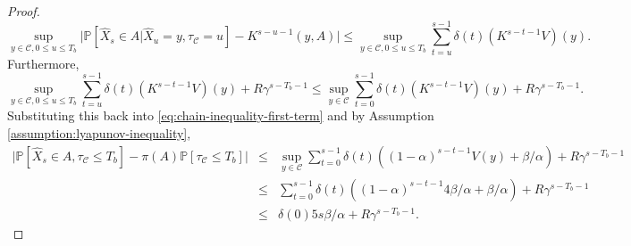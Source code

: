 \begin{proof}
\begin{equation*}
  \sup_{y \in \mathcal{C}, 0 \leq u \leq T_b}{\vert 
\mathbb{P}[\hat{X}_s\in A \vert \hat{X}_u = y, \tau_{\mathcal{C}}=u] - K^{s-u-1}(y, A) \vert} \leq \sup_{y \in \mathcal{C}, 0 \leq u \leq T_b}{\sum_{t=u}^{s-1} \delta(t) (K^{s-t-1} V)(y)}.
\end{equation*}
%
Furthermore,
\begin{equation*}
    \sup_{y \in \mathcal{C}, 0 \leq u \leq T_b}{\sum_{t=u}^{s-1} \delta(t) (K^{s-t-1} V)(y)} +  R \gamma^{s-T_b-1}  \leq \sup_{y \in \mathcal{C}}{\sum_{t=0}^{s-1} \delta(t) (K^{s-t-1} V)(y)} +  R \gamma^{s-T_b-1}.
\end{equation*}
Substituting this back into \eqref{eq:chain-inequality-first-term} and by Assumption \ref{assumption:lyapunov-inequality}, 
\begin{subequations}
\begin{eqnarray}
    \vert \mathbb{P}[\hat{X}_s \in A, \tau_{\mathcal{C}} \leq T_b] - \pi(A) \mathbb{P}[\tau_{\mathcal{C}} \leq T_b] \vert  &\leq& \sup_{y \in \mathcal{C}}{\sum_{t=0}^{s-1} \delta(t) ((1-\alpha)^{s-t-1} V(y) + \beta/\alpha)} +  R \gamma^{s-T_b-1} \\
    &\leq& \sum_{t=0}^{s-1} \delta(t) ((1-\alpha)^{s-t-1} 4 \beta/\alpha + \beta/\alpha) +  R \gamma^{s-T_b-1} \\
    &\leq& \delta(0) 5 s \beta /\alpha +  R \gamma^{s-T_b-1}.
\end{eqnarray}
\label{eq:chain-inequality-first-term-bound}
\end{subequations}


\end{proof}
